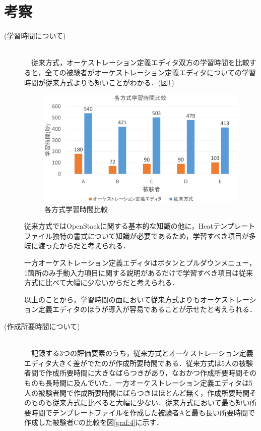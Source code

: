 \documentclass[mingoth]{kut-paper}		%
\begin{document}
	\section{考察}
	\begin{description}
		\item[(学習時間について)]\mbox{}\\ 　従来方式，オーケストレーション定義エディタ双方の学習時間を比較すると，全ての被験者がオーケストレーション定義エディタについての学習時間が従来方式よりも短いことがわかる．(図\ref{graf:8})
		
			\begin{figure}[H]
				\begin{center}
					\includegraphics[scale=0.42]{Document/studytime_all.eps}
					\caption{各方式学習時間比較}
					\label{graf:8}
				\end{center}
			\end{figure}
		
		従来方式ではOpenStackに関する基本的な知識の他に，Heatテンプレートファイル独特の書式について知識が必要であるため，学習すべき項目が多岐に渡ったからだと考えられる．
		
		一方オーケストレーション定義エディタはボタンとプルダウンメニュー，1箇所のみ手動入力項目に関する説明があるだけで学習すべき項目は従来方式に比べて大幅に少ないからだと考えられる．
		
		以上のことから，学習時間の面において従来方式よりもオーケストレーション定義エディタのほうが導入が容易であることが示せたと考えられる．
		
		\item[(作成所要時間について)]\mbox{}\\ 　記録する3つの評価要素のうち，従来方式とオーケストレーション定義エディタ大きく差がでたのが作成所要時間である．従来方式は5人の被験者間で作成所要時間に大きなばらつきがあり，なおかつ作成所要時間そのものも長時間に及んでいた．一方オーケストレーション定義エディタは5人の被験者間で作成所要時間にばらつきはほとんど無く，作成所要時間そのものも従来方式に比べると大幅に少ない．従来方式において最も短い所要時間でテンプレートファイルを作成した被験者Aと最も長い所要時間で作成した被験者Cの比較を図\ref{graf:4}に示す．
		

\end{description}
\end{document}
